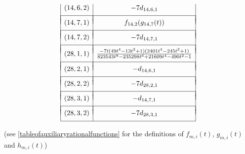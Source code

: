 \begin{table}[!ht]
\[\begin{array}{|c|c|}
(14,6,2) & -7 d_{14,6,1} \\
& \\ [-.75em]
\hline
& \\ [-.75em]
(14,7,1) & f_{14,2}(g_{14,7}(t)) \\
& \\ [-.75em]
\hline
& \\ [-.75em]
(14,7,2) &  -7 d_{14,7,1} \\
& \\ [-.75em]
\hline
& \\ [-.75em]
(28,1,1) & \frac{-7t(49t^4 - 13t^2 + 1)(2401t^4 - 245t^2 + 1)}{823543t^8 - 235298t^6 + 21609t^4 - 490t^2 - 1} \\
& \\ [-.75em]
\hline
& \\ [-.75em]
(28,2,1) &  - d_{14,6,1}  \\
& \\ [-.75em]
\hline
& \\ [-.75em]
(28,2,2) & -7 d_{28,2,1}  \\
& \\ [-.75em]
\hline
& \\ [-.75em]
(28,3,1) & - d_{14,7,1}  \\
& \\ [-.75em]
\hline
& \\ [-.75em]
(28,3,2) &-7 d_{28,3,1} \\ [.5em]
\hline
\end{array}
\]


\vspace{.1in}
\caption{ Twist parameters associated to maximal genus zero missing trace groups for  $m \geq 14$}
\label{masterlistoftwistparameters3}
\begin{center}
(see \ref{tableofauxiliaryrationalfunctions} for the definitions of $f_{m,i}(t)$, $g_{m,i}(t)$ and $h_{m,i}(t)$)
\end{center}
\end{table}

